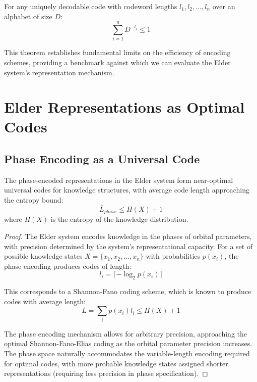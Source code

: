 \begin{theorem}
For any uniquely decodable code with codeword lengths $l_1, l_2, \ldots, l_n$ over an alphabet of size $D$:
\begin{equation}
\sum_{i=1}^n D^{-l_i} \leq 1
\end{equation}
\end{theorem}

This theorem establishes fundamental limits on the efficiency of encoding schemes, providing a benchmark against which we can evaluate the Elder system's representation mechanism.

\section{Elder Representations as Optimal Codes}

\subsection{Phase Encoding as a Universal Code}

\begin{theorem}
The phase-encoded representations in the Elder system form near-optimal universal codes for knowledge structures, with average code length approaching the entropy bound:
\begin{equation}
\overline{L}_{phase} \leq H(X) + 1
\end{equation}
where $H(X)$ is the entropy of the knowledge distribution.
\end{theorem}

\begin{proof}
The Elder system encodes knowledge in the phases of orbital parameters, with precision determined by the system's representational capacity. For a set of possible knowledge states $X = \{x_1, x_2, \ldots, x_n\}$ with probabilities $p(x_i)$, the phase encoding produces codes of length:
\begin{equation}
l_i = \lceil -\log_2 p(x_i) \rceil
\end{equation}

This corresponds to a Shannon-Fano coding scheme, which is known to produce codes with average length:
\begin{equation}
\overline{L} = \sum_i p(x_i) l_i \leq H(X) + 1
\end{equation}

The phase encoding mechanism allows for arbitrary precision, approaching the optimal Shannon-Fano-Elias coding as the orbital parameter precision increases. The phase space naturally accommodates the variable-length encoding required for optimal codes, with more probable knowledge states assigned shorter representations (requiring less precision in phase specification).
\end{proof}


